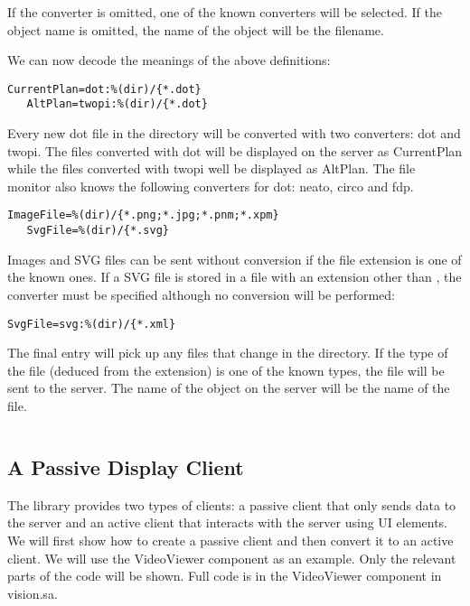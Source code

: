 If the converter is omitted, one of the known converters will be selected.
If the object name is omitted, the name of the object will be the filename.

We can now decode the meanings of the above definitions:

\begin{Verbatim}[fontsize=\scriptsize,gobble=3]
   CurrentPlan=dot:%(dir)/{*.dot}
   AltPlan=twopi:%(dir)/{*.dot}
\end{Verbatim}

Every new dot file in the directory will be converted with two converters: dot
and twopi. The files converted with dot will be displayed on the server as
CurrentPlan while the files converted with twopi well be displayed as AltPlan.
The file monitor also knows the following converters for dot: neato, circo and
fdp.

\begin{Verbatim}[fontsize=\scriptsize,gobble=3]
   ImageFile=%(dir)/{*.png;*.jpg;*.pnm;*.xpm}
   SvgFile=%(dir)/{*.svg}
\end{Verbatim}

Images and SVG files can be sent without conversion if the file extension is
one of the known ones. If a SVG file is stored in a file with an extension
other than , the converter must be specified although no conversion
will be performed:

\begin{Verbatim}[fontsize=\scriptsize,gobble=3]
   SvgFile=svg:%(dir)/{*.xml}
\end{Verbatim}

The final entry will pick up any files that change in the directory. If the
type of the file (deduced from the extension) is one of the known types, the
file will be sent to the server. The name of the object on the server will be
the name of the file.

\begin{Verbatim}[fontsize=\scriptsize,gobble=3]
   %(dir)/{*}"
\end{Verbatim}

\subsection{A Passive Display Client}

The library provides two types of clients: a passive client that only sends
data to the server and an active client that interacts with the server using UI
elements. We will first show how to create a passive client and then convert it
to an active client. We will use the VideoViewer component as an example. Only
the relevant parts of the code will be shown. Full code is in the VideoViewer
component in vision.sa.

